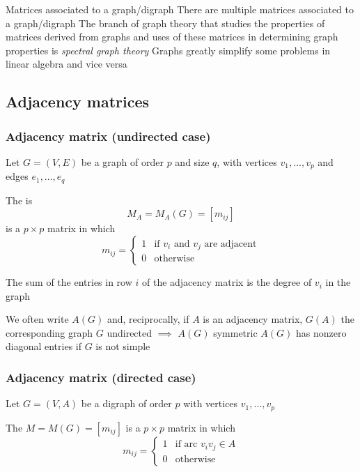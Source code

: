 \documentclass[aspectratio=43]{beamer}
\begin{document}
\begin{frame}{Matrices associated to a graph/digraph}
	There are multiple matrices associated to a graph/digraph
	\vfill
	The branch of graph theory that studies the properties of matrices derived from graphs and uses of these matrices in determining graph properties is \emph{spectral graph theory}
	\vfill
	Graphs greatly simplify some problems in linear algebra and vice versa
\end{frame}

\subsection{Adjacency matrices}


\begin{frame}\frametitle{Adjacency matrix (undirected case)}
	Let $G=(V,E)$ be a graph of order $p$ and size $q$, with vertices $v_1, \ldots, v_p$ and edges $e_1, \dots , e_q$
	\begin{definition}
		The  is $$M_A=M_A(G)=[m_{ij}]$$ is a $p\times p$ matrix in which
		$$m_{ij}=\left \{ 
		\begin{array}{cc}
			1 & \textrm{if } v_i \textrm{ and } v_j \textrm{ are adjacent}\\
			0 & \textrm{otherwise}
		\end{array}
		\right .
		$$
	\end{definition}
\end{frame}

\begin{frame}
	\begin{theorem}
		The sum of the entries in row $i$ of the adjacency matrix is the degree of $v_i$ in the graph
	\end{theorem}
	\vfill
	We often write $A(G)$ and, reciprocally, if $A$ is an adjacency matrix, $G(A)$ the corresponding graph
	\vfill
	$G$ undirected $\implies$ $A(G)$ symmetric
	\vfill
	$A(G)$ has nonzero diagonal entries if $G$ is not simple
\end{frame}

\begin{frame}\frametitle{Adjacency matrix (directed case)}
	Let $G=(V,A)$ be a digraph of order $p$ with vertices $v_1,\ldots,v_p$
	\begin{definition}
	The  $M=M(G)=[m_{ij}]$ is a $p\times p$ matrix in which
	$$m_{ij}=\left \{ 
	\begin{array}{cl}
	1 & \textrm{if arc } v_iv_j \in A\\
	0 & \textrm{otherwise}
	\end{array}
	\right .
	$$
	\end{definition}
\end{frame}
\end{document}
